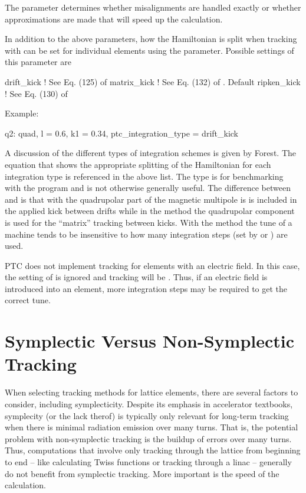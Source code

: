 The  parameter determines whether misalignments are handled exactly or
whether approximations are made that will speed up the calculation.

In addition to the above parameters, how the Hamiltonian is split when tracking with  can be
set for individual elements using the  parameter. Possible settings of this
parameter are
\begin{example}
  drift_kick    ! See Eq. (125) of \cite{b:geo.int}
  matrix_kick   ! See Eq. (132) of \cite{b:geo.int}. Default
  ripken_kick   ! See Eq. (130) of \cite{b:geo.int}
\end{example}
Example:
\begin{example}
  q2: quad, l = 0.6, k1 = 0.34, ptc_integration_type = drift_kick
\end{example}
A discussion of the different types of integration schemes is given by Forest\cite{b:geo.int}. The
equation that shows the appropriate splitting of the Hamiltonian for each integration type is
referenced in the above list. The  type is for benchmarking with the 
program and is not otherwise generally useful. The difference between  and
 is that with  the quadrupolar part of the magnetic multipole is is
included in the applied kick between drifts while in the  method the quadrupolar
component is used for the ``matrix'' tracking between kicks. With the  method the
tune of a machine tends to be insensitive to how many integration steps (set by  or
) are used.

PTC does not implement  tracking for elements with an electric field. In this case,
the setting of  is ignored and tracking will be . Thus, if
an electric field is introduced into an element, more integration steps may be required to get the
correct tune.

\section{Symplectic Versus Non-Symplectic Tracking}
\label{s:non.symp}

When selecting tracking methods for lattice elements, there are several factors to consider,
including symplecticity. Despite its emphasis in accelerator textbooks, symplecity (or the lack
therof) is typically only relevant for long-term tracking when there is minimal radiation emission
over many turns. That is, the potential problem with non-symplectic tracking is the buildup of
errors over many turns. Thus, computations that involve only tracking through the lattice from
beginning to end -- like calculating Twiss functions or tracking through a linac -- generally do not
benefit from symplectic tracking. More important is the speed of the calculation.

